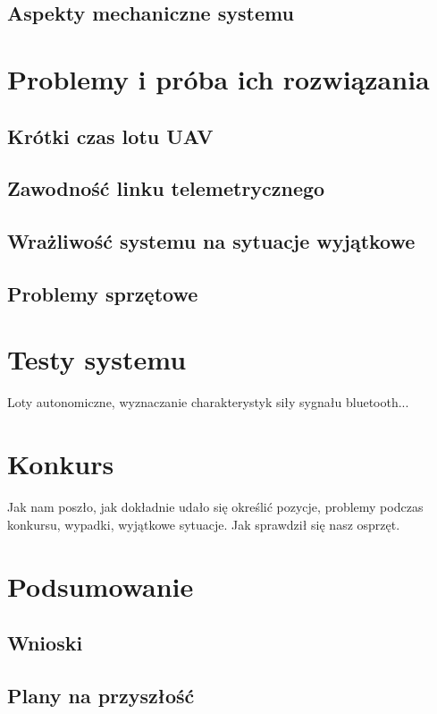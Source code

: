 \subsection{Aspekty mechaniczne systemu}

\section{Problemy i próba ich rozwiązania}
\subsection{Krótki czas lotu UAV}
\subsection{Zawodność linku telemetrycznego}
\subsection{Wrażliwość systemu na sytuacje wyjątkowe}
\subsection{Problemy sprzętowe}

\section{Testy systemu}
Loty autonomiczne, wyznaczanie charakterystyk siły sygnału bluetooth...

\section{Konkurs}
Jak nam poszło, jak dokładnie udało się określić pozycje, problemy podczas konkursu, wypadki, wyjątkowe sytuacje. Jak sprawdził się nasz osprzęt.

\section{Podsumowanie}
\subsection{Wnioski}
\subsection{Plany na przyszłość}
